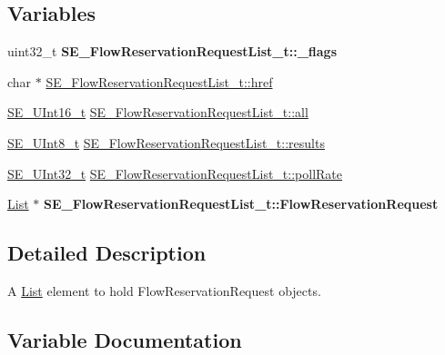 \subsection*{Variables}
\begin{DoxyCompactItemize}
\item 
\mbox{\label{group__FlowReservationRequestList_gac2924e3d163902d6239fdf927478d983}} 
uint32\+\_\+t {\bfseries S\+E\+\_\+\+Flow\+Reservation\+Request\+List\+\_\+t\+::\+\_\+flags}
\item 
char $\ast$ \hyperlink{group__FlowReservationRequestList_ga4b986404c45f6995659822cc30a09aeb}{S\+E\+\_\+\+Flow\+Reservation\+Request\+List\+\_\+t\+::href}
\item 
\hyperlink{group__UInt16_gac68d541f189538bfd30cfaa712d20d29}{S\+E\+\_\+\+U\+Int16\+\_\+t} \hyperlink{group__FlowReservationRequestList_ga36c99aa80100cea5ffb0852b72adec6a}{S\+E\+\_\+\+Flow\+Reservation\+Request\+List\+\_\+t\+::all}
\item 
\hyperlink{group__UInt8_gaf7c365a1acfe204e3a67c16ed44572f5}{S\+E\+\_\+\+U\+Int8\+\_\+t} \hyperlink{group__FlowReservationRequestList_ga15c8b02101d4721254fb56573632a332}{S\+E\+\_\+\+Flow\+Reservation\+Request\+List\+\_\+t\+::results}
\item 
\hyperlink{group__UInt32_ga70bd4ecda3c0c85d20779d685a270cdb}{S\+E\+\_\+\+U\+Int32\+\_\+t} \hyperlink{group__FlowReservationRequestList_gae849ed542c4f144ffebb5351e300807c}{S\+E\+\_\+\+Flow\+Reservation\+Request\+List\+\_\+t\+::poll\+Rate}
\item 
\mbox{\label{group__FlowReservationRequestList_gadcdab543b957ed08ec4ada05c19164a4}} 
\hyperlink{structList}{List} $\ast$ {\bfseries S\+E\+\_\+\+Flow\+Reservation\+Request\+List\+\_\+t\+::\+Flow\+Reservation\+Request}
\end{DoxyCompactItemize}


\subsection{Detailed Description}
A \hyperlink{structList}{List} element to hold Flow\+Reservation\+Request objects. 

\subsection{Variable Documentation}
\mbox{\label{group__FlowReservationRequestList_ga36c99aa80100cea5ffb0852b72adec6a}} 
